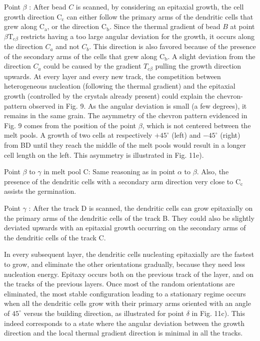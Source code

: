 \documentclass[10pt]{article}
\begin{document}
Point $\beta$ : After bead $C$ is scanned, by considering an epitaxial growth, the cell growth direction $\mathrm{C}_{\mathrm{c}}$ can either follow the primary arms of the dendritic cells that grew along $\mathrm{C}_{\mathrm{a}}$, or the direction $\mathrm{C}_{\mathrm{b}}$. Since the thermal gradient of bead $B$ at point $\beta \mathrm{T}_{\mathrm{c} \beta}$ restricts having a too large angular deviation for the growth, it occurs along the direction $C_{a}$ and not $C_{b}$. This direction is also favored because of the presence of the secondary arms of the cells that grew along $\mathrm{C}_{\mathrm{b}}$. A slight deviation from the direction $C_{a}$ could be caused by the gradient $T_{c \beta}$ pulling the growth direction upwards. At every layer and every new track, the competition between heterogeneous nucleation (following the thermal gradient) and the epitaxial growth (controlled by the crystals already present) could explain the chevron-pattern observed in Fig. 9. As the angular deviation is small (a few degrees), it remains in the same grain. The asymmetry of the chevron pattern evidenced in Fig. 9 comes from the position of the point $\beta$, which is not centered between the melt pools. A growth of two cells at respectively $+45^{\circ}$ (left) and $-45^{\circ}$ (right) from BD until they reach the middle of the melt pools would result in a longer cell length on the left. This asymmetry is illustrated in Fig. 11e).

Point $\beta$ to $\gamma$ in melt pool C: Same reasoning as in point $\alpha$ to $\beta$. Also, the presence of the dendritic cells with a secondary arm direction very close to $\mathrm{C}_{\mathrm{c}}$ assists the germination.

Point $\gamma$ : After the track $\mathrm{D}$ is scanned, the dendritic cells can grow epitaxially on the primary arms of the dendritic cells of the track B. They could also be slightly deviated upwards with an epitaxial growth occurring on the secondary arms of the dendritic cells of the track C.

In every subsequent layer, the dendritic cells nucleating epitaxially are the fastest to grow, and eliminate the other orientations gradually, because they need less nucleation energy. Epitaxy occurs both on the previous track of the layer, and on the tracks of the previous layers. Once most of the random orientations are eliminated, the most stable configuration leading to a stationary regime occurs when all the dendritic cells grow with their primary arms oriented with an angle of $45^{\circ}$ versus the building direction, as illustrated for point $\delta$ in Fig. 11c). This indeed corresponds to a state where the angular deviation between the growth direction and the local thermal gradient direction is minimal in all the tracks.
\end{document}
